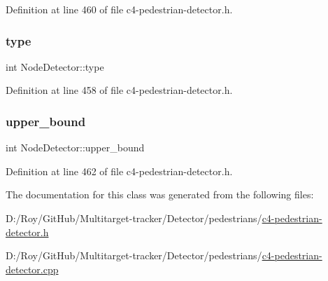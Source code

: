 Definition at line 460 of file c4-\/pedestrian-\/detector.\+h.

\mbox{\label{class_node_detector_a96a5ab514f7996e4e64fff8d37199f64}} 
\subsubsection{\texorpdfstring{type}{type}}
{\footnotesize\ttfamily int Node\+Detector\+::type}



Definition at line 458 of file c4-\/pedestrian-\/detector.\+h.

\mbox{\label{class_node_detector_a904a3a37a99f506752794a979314548a}} 
\subsubsection{\texorpdfstring{upper\+\_\+bound}{upper\_bound}}
{\footnotesize\ttfamily int Node\+Detector\+::upper\+\_\+bound}



Definition at line 462 of file c4-\/pedestrian-\/detector.\+h.



The documentation for this class was generated from the following files\+:\begin{DoxyCompactItemize}
\item 
D\+:/\+Roy/\+Git\+Hub/\+Multitarget-\/tracker/\+Detector/pedestrians/\mbox{\hyperlink{c4-pedestrian-detector_8h}{c4-\/pedestrian-\/detector.\+h}}\item 
D\+:/\+Roy/\+Git\+Hub/\+Multitarget-\/tracker/\+Detector/pedestrians/\mbox{\hyperlink{c4-pedestrian-detector_8cpp}{c4-\/pedestrian-\/detector.\+cpp}}\end{DoxyCompactItemize}
